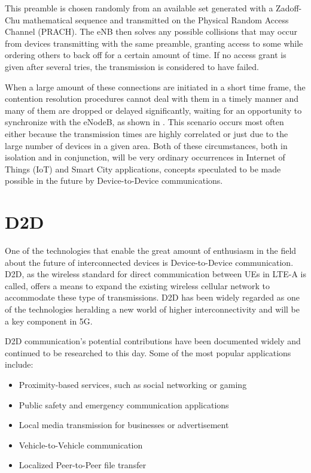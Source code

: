 This preamble is chosen randomly from an available set generated with a Zadoff-Chu mathematical sequence and transmitted on the Physical Random Access Channel (PRACH). The eNB then solves any possible collisions that may occur from devices transmitting with the same preamble, granting access to some while ordering others to back off for a certain amount of time. If no access grant is given after several tries, the transmission is considered to have failed.

When a large amount of these connections are initiated in a short time frame, the contention resolution procedures cannot deal with them in a timely manner and many of them are dropped or delayed significantly, waiting for an opportunity to synchronize with the eNodeB, as shown in \cite{Polese2016}. This scenario occurs most often either because the transmission times are highly correlated or just due to the large number of devices in a given area. Both of these circumstances, both in isolation and in conjunction, will be very ordinary occurrences in Internet of Things (IoT) and Smart City applications, concepts speculated to be made possible in the future by Device-to-Device communications. 

\section{D2D}\label{B:D2D}
One of the technologies that enable the great amount of enthusiasm in the field about the future of interconnected devices is Device-to-Device communication. D2D, as the wireless standard for direct communication between UEs in LTE-A is called, offers a means to expand the existing wireless cellular network to accommodate these type of transmissions. D2D has been widely regarded as one of the technologies heralding a new world of higher interconnectivity and will be a key component in 5G.

D2D communication's potential contributions have been documented widely and continued to be researched to this day. Some of the most popular applications include:
\begin{itemize}
\item Proximity-based services, such as social networking or gaming
\item Public safety and emergency communication applications
\item Local media transmission for businesses or advertisement
\item Vehicle-to-Vehicle communication
\item Localized Peer-to-Peer file transfer
\end{itemize}

